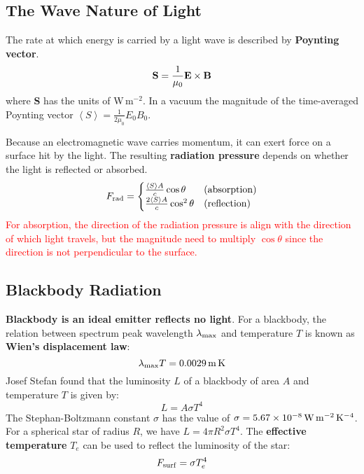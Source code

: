 \documentclass{article}
\numberwithin{equation}{section}
\numberwithin{figure}{section}
\newcommand{\red}[1]{\textcolor{red}{#1}}
\begin{document}
	\subsection{The Wave Nature of Light}
	The rate at which energy is carried by a light wave is described by {\bf Poynting vector}.
	\begin{equation}
		{\bf S} = \frac{1}{\mu_0}{\bf E}\times{\bf B}
	\end{equation}
	where {\bf S} has the units of W\,m$^{-2}$. In a vacuum the magnitude of the time-averaged Poynting vector $\left\langle S\right\rangle=\frac{1}{2\mu_0}E_0B_0$.
	
	Because an electromagnetic wave carries momentum, it can exert force on a surface hit by the light. The resulting {\bf radiation pressure} depends on whether the light is reflected or absorbed.
	\begin{equation}
		F_{\rm rad} = 
		\begin{cases}
		\frac{\left\langle S\right\rangle A}{c}\cos\theta & ({\rm absorption}) \\
		\frac{2\left\langle S\right\rangle A}{c}\cos^2\theta & ({\rm reflection})
		\end {cases}
	\end{equation}
	\red{For absorption, the direction of the radiation pressure is align with the direction of which light travels, but the magnitude need to multiply $\cos\theta$ since the direction is not perpendicular to the surface.}
	
	\subsection{Blackbody Radiation}
	{\bf Blackbody is an ideal emitter reflects no light}. For a blackbody, the relation between spectrum peak wavelength $\lambda_{\rm max}$ and temperature $T$ is known as {\bf Wien's displacement law}:
	\begin{equation}
		\lambda_{\rm max}T = 0.0029\,{\rm m}\,{\rm K}
	\end{equation}
	Josef Stefan found that the luminosity $L$ of a blackbody of area $A$ and temperature $T$ is given by:
	\begin{equation}
		L = A\sigma T^4
	\end{equation}
	The Stephan-Boltzmann constant $\sigma$ has the value of $\sigma = 5.67\times10^{-8}\,{\rm W}\,{\rm m}^{-2}\,{\rm K}^{-4}$. For a spherical star of radius $R$, we have $L = 4\pi R^2\sigma T^4$. The {\bf effective temperature} $T_e$ can be used to reflect the luminosity of the star:
	\begin{equation}
		F_{\rm surf} = \sigma T_e^4
	\end{equation}
	
\end{document}
